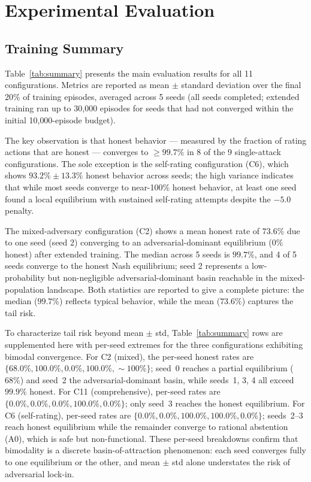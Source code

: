 \section{Experimental Evaluation}
\label{sec:eval}

\subsection{Training Summary}

Table~\ref{tab:summary} presents the main evaluation results for all 11
configurations.  Metrics are reported as mean $\pm$ standard deviation over
the final 20\% of training episodes, averaged across 5 seeds (all seeds
completed; extended training ran up to 30{,}000 episodes for seeds that had
not converged within the initial 10{,}000-episode budget).



The key observation is that honest behavior — measured by the fraction of
rating actions that are honest — converges to $\geq\!99.7\%$ in 8 of the 9
single-attack configurations.  The sole exception is the self-rating
configuration (C6), which shows $93.2\% \pm 13.3\%$ honest behavior across
seeds; the high variance indicates that while most seeds converge to near-100\%
honest behavior, at least one seed found a local equilibrium with sustained
self-rating attempts despite the $-5.0$ penalty.

The mixed-adversary configuration (C2) shows a mean honest rate of $73.6\%$
due to one seed (seed 2) converging to an adversarial-dominant equilibrium
($0\%$ honest) after extended training.  The median across 5 seeds is
$99.7\%$, and 4 of 5 seeds converge to the honest Nash equilibrium; seed 2
represents a low-probability but non-negligible adversarial-dominant basin
reachable in the mixed-population landscape.  Both statistics are reported
to give a complete picture: the median ($99.7\%$) reflects typical behavior,
while the mean ($73.6\%$) captures the tail risk.

To characterize tail risk beyond mean $\pm$ std, Table~\ref{tab:summary}
rows are supplemented here with per-seed extremes for the three configurations
exhibiting bimodal convergence.
For C2 (mixed), the per-seed honest rates are
$\{68.0\%, 100.0\%, 0.0\%, 100.0\%, \sim\!100\%\}$; seed~0 reaches a
partial equilibrium ($68\%$) and seed~2 the adversarial-dominant basin,
while seeds~1, 3, 4 all exceed $99.9\%$ honest.
For C11 (comprehensive), per-seed rates are
$\{0.0\%, 0.0\%, 0.0\%, 100.0\%, 0.0\%\}$; only seed~3 reaches the honest
equilibrium.
For C6 (self-rating), per-seed rates are
$\{0.0\%, 0.0\%, 100.0\%, 100.0\%, 0.0\%\}$; seeds~2--3 reach honest
equilibrium while the remainder converge to rational abstention (A0), which
is safe but non-functional.
These per-seed breakdowns confirm that bimodality is a discrete
basin-of-attraction phenomenon: each seed converges fully to one equilibrium
or the other, and mean $\pm$ std alone understates the risk of adversarial lock-in.

